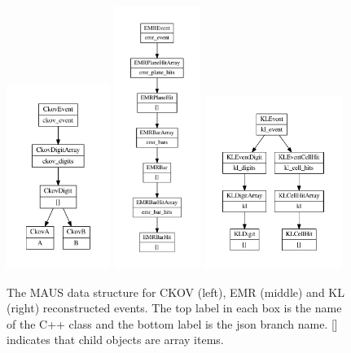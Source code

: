 \documentclass{JINST}
\begin{document}
\begin{figure}[ptb]
\centering
\includegraphics[width=0.3\textwidth]{figs/ckov_datastructure.pdf}
\includegraphics[width=0.25\textwidth]{figs/emr_datastructure.pdf}
\includegraphics[width=0.4\textwidth]{figs/kl_datastructure.pdf}
\caption{The MAUS data structure for CKOV (left), EMR (middle) and KL (right) reconstructed events. The top label in each box is the name of the C++ class and the bottom label is the json branch name. [] indicates that child objects are array items.}
\label{fig:datastructure-recon-ckov-emr-kl}
\end{figure}
\end{document}
